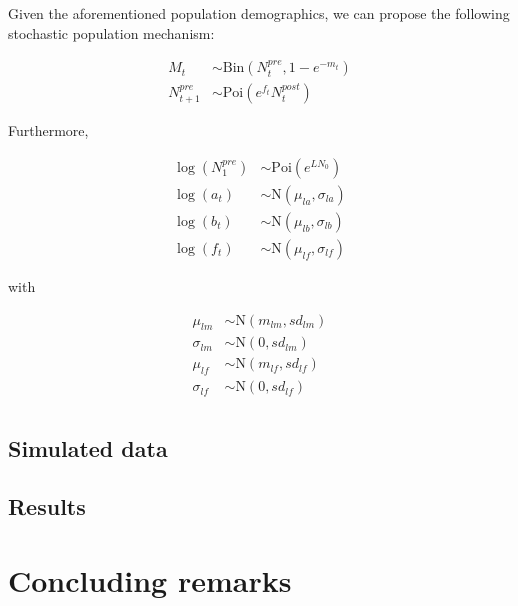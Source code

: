 \documentclass[12pt,a4paper]{article}
\begin{document}
Given the aforementioned population demographics, we can propose the following stochastic population mechanism:

\begin{align*}
M_{t} &\sim \mathrm{Bin}\left( N_{t}^{pre}, 1-e^{-m_{t}} \right)\\
N_{t+1}^{pre} &\sim \mathrm{Poi}\left( e^{f_{t}}N_{t}^{post} \right)
\end{align*}

Furthermore,

\begin{align*}
\log(N^{pre}_{1}) &\sim \mathrm{Poi}\left( e^{LN_{0}} \right)\\
\log(a_{t}) &\sim \mathrm{N}\left( \mu_{la}, \sigma_{la} \right)\\
\log(b_{t}) &\sim \mathrm{N}\left( \mu_{lb}, \sigma_{lb} \right)\\
\log(f_{t}) &\sim \mathrm{N}\left( \mu_{lf}, \sigma_{lf} \right)
\end{align*}

with

\begin{align*}
\mu_{lm} &\sim \mathrm{N}\left( m_{lm}, sd_{lm} \right)\\
\sigma_{lm} &\sim \mathrm{N}\left( 0, sd_{lm} \right)\\
\mu_{lf} &\sim \mathrm{N}\left( m_{lf}, sd_{lf} \right)\\
\sigma_{lf} &\sim \mathrm{N}\left( 0, sd_{lf} \right)\\
\end{align*}

\subsection{Simulated data}

\subsection{Results}

\section{Concluding remarks}
\label{sec:summary}




\cleardoublepage
\end{document}
